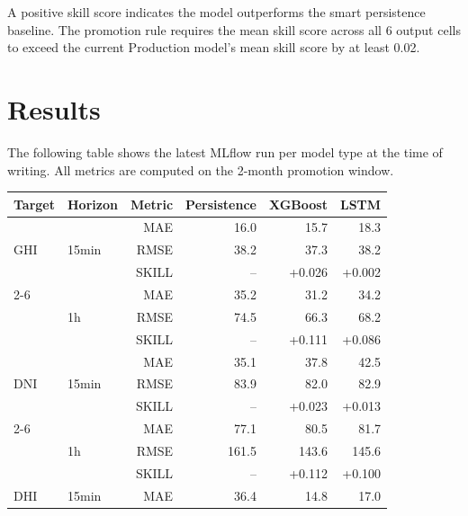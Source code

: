 \documentclass[11pt,a4paper]{article}
\begin{document}
A positive skill score indicates the model outperforms the smart persistence baseline. The promotion rule requires the mean skill score across all 6 output cells to exceed the current Production model's mean skill score by at least 0.02.

\section{Results}

The following table shows the latest MLflow run per model type at the time of writing. All metrics are computed on the 2-month promotion window.

\begin{table}[H]
\centering
\small
\begin{tabular}{@{}llrrrr@{}}
\toprule
\textbf{Target} & \textbf{Horizon} & \textbf{Metric} & \textbf{Persistence} & \textbf{XGBoost} & \textbf{LSTM} \\
\midrule
\multirow{3}{*}{GHI} & \multirow{3}{*}{15min} & MAE   & 16.0  & 15.7  & 18.3 \\
                     &                        & RMSE  & 38.2  & 37.3  & 38.2 \\
                     &                        & SKILL &  --      & +0.026 & +0.002 \\
\cmidrule{2-6}
\multirow{3}{*}{GHI} & \multirow{3}{*}{1h}   & MAE   & 35.2  & 31.2  & 34.2 \\
                     &                        & RMSE  & 74.5  & 66.3  & 68.2 \\
                     &                        & SKILL &  --      & +0.111 & +0.086 \\
\midrule
\multirow{3}{*}{DNI} & \multirow{3}{*}{15min} & MAE   & 35.1  & 37.8  & 42.5 \\
                     &                        & RMSE  & 83.9  & 82.0  & 82.9 \\
                     &                        & SKILL &  --      & +0.023 & +0.013 \\
\cmidrule{2-6}
\multirow{3}{*}{DNI} & \multirow{3}{*}{1h}   & MAE   & 77.1  & 80.5  & 81.7 \\
                     &                        & RMSE  & 161.5 & 143.6 & 145.6 \\
                     &                        & SKILL &  --      & +0.112 & +0.100 \\
\midrule
\multirow{3}{*}{DHI} & \multirow{3}{*}{15min} & MAE   & 36.4  & 14.8  & 17.0 \\

\end{tabular}
\end{table}
\end{document}
